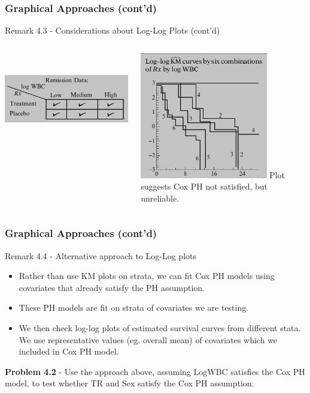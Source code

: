 \documentclass{beamer}
\theoremstyle{definition}
\begin{document}
\begin{frame}
\frametitle{Graphical Approaches (cont'd)}
\begin{block}{Remark 4.3 - Considerations about Log-Log Plots (cont'd)}
\begin{columns}
    \begin{column}{0.48\textwidth}
        \includegraphics[width =\textwidth, height=4cm]{CH4_loglogMC.JPG}
    \end{column}
    \hspace{-10pt}
    \begin{column}{0.48\textwidth}
         \includegraphics[width =\textwidth, height=5.5cm]{Ch4_loglog6.JPG}
          Plot suggests Cox PH not satisfied, but unreliable.
    \end{column}
\end{columns}
\end{block}
\end{frame}

\begin{frame}
\frametitle{Graphical Approaches (cont'd)}
\begin{block}{Remark 4.4 - Alternative approach to Log-Log plots}
\begin{itemize}
\item Rather than use KM plots on strata, we can fit Cox PH models using covariates that already satisfy the PH assumption.
\item These PH models are fit on strata of covariates we are testing.
\item We then check log-log plots of estimated survival curves from different stata.  We use representative values (eg. overall mean) of covariates which we included in Cox PH model.
\end{itemize}
\textbf{Problem 4.2} - Use the approach above, assuming LogWBC satisfies the Cox PH model, to test whether TR and Sex satisfy the Cox PH assumption.
\end{block}
\end{frame}
\end{document}
